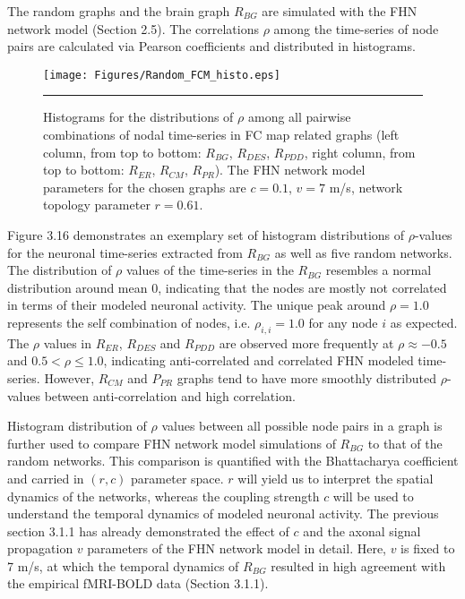 The random graphs  and the brain graph $R_{BG}$ are simulated with the FHN network model (Section 2.5). The correlations $\rho$ among the time-series of node pairs are calculated via Pearson coefficients and distributed in histograms.
 
\begin{figure}[htbp]
 
  \centering
	 \texttt{[image: Figures/Random\_FCM\_histo.eps]}
	 \rule{35em}{0.5pt}
  \caption[Histogram Comparison, FCM]{Histograms for the  distributions of $\rho$ among all pairwise combinations of nodal time-series in FC map related graphs (left column, from top to bottom: $R_{BG}$, $R_{DES}$, $R_{PDD}$, right column, from top to bottom: $R_{ER}$, $R_{CM}$, $R_{PR}$).  The FHN network model parameters for the chosen graphs are $c=0.1$, $v=7$ m/s, network topology parameter $r=0.61$. } 
    \label{fig:Histogram Comparison, FCM}
 	
\end{figure}  


Figure 3.16 demonstrates an exemplary set of histogram distributions of $\rho$-values for the neuronal time-series extracted from $R_{BG}$  as well as five random networks. The distribution of $\rho$ values of the time-series in the $R_{BG}$ resembles a normal distribution around mean 0, indicating that the nodes are mostly not correlated in terms of their modeled neuronal activity. The unique peak around $\rho=1.0$ represents the self combination of nodes, i.e. $\rho_{i,i}=1.0$ for any node $i$ as expected. The $\rho$ values in $R_{ER}$, $R_{DES}$ and $R_{PDD}$ are observed more frequently at $\rho \approx -0.5 $ and $0.5 <  \rho \leq 1.0 $, indicating anti-correlated and correlated FHN modeled time-series. However, $R_{CM}$ and $P_{PR}$ graphs tend to have more smoothly distributed $\rho$-values between anti-correlation and high correlation.  



Histogram distribution of $\rho$ values between all possible node pairs in a graph is further used to compare FHN network model simulations of $R_{BG}$ to that of the random networks. This comparison is quantified with the Bhattacharya coefficient and carried in $(r,c)$ parameter space. $r$ will yield us to interpret the spatial dynamics of the networks, whereas the coupling strength $c$ will be used to understand the temporal dynamics of modeled neuronal activity. The previous section 3.1.1 has already demonstrated the effect of $c$ and the axonal signal propagation $v$ parameters of the FHN network model in detail. Here, $v$ is fixed to 7 m/s, at which the temporal dynamics of $R_{BG}$ resulted in high agreement with the empirical fMRI-BOLD data (Section 3.1.1).  


